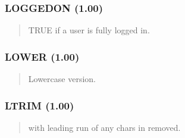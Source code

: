 \documentclass[letterpaper,10pt,english]{sphinxmanual}
\begin{document}
\subsubsection{LOGGEDON (1.00)}
\label{\detokenize{ppl:loggedon-1-00}}\begin{quote}

\sphinxAtStartPar
{}
\begin{description}
\sphinxAtStartPar
TRUE if a user is fully logged in.

\end{description}
\end{quote}


\subsubsection{LOWER (1.00)}
\label{\detokenize{ppl:lower-1-00}}\begin{quote}

\sphinxAtStartPar
{}
\begin{description}
\sphinxAtStartPar
Lower\sphinxhyphen{}case version.

\end{description}
\end{quote}


\subsubsection{LTRIM (1.00)}
\label{\detokenize{ppl:ltrim-1-00}}\begin{quote}

\sphinxAtStartPar
{}
\begin{description}
\sphinxAtStartPar
{} with leading run of any chars in  removed.

\end{description}
\end{quote}
\end{document}
